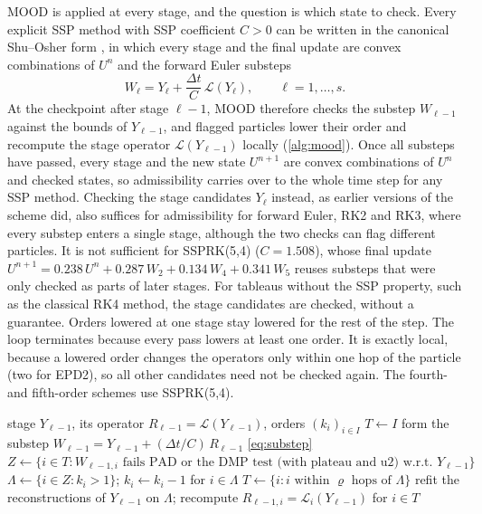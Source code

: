 \documentclass[11pt,a4paper]{article}
\numberwithin{equation}{section}
\newcommand{\Lop}{\mathcal{L}}
\begin{document}
MOOD is applied at every stage, and the question is which state to check. Every explicit SSP method with SSP coefficient $C>0$ can be written in the canonical Shu--Osher form \cite{Ketcheson2008,GottliebKetchesonShu2011}, in which every stage and the final update are convex combinations of $U^n$ and the forward Euler substeps
\begin{equation}\label{eq:substep}
W_\ell = Y_\ell+\frac{\Delta t}{C}\,\Lop(Y_\ell),\qquad \ell=1,\dots,s.
\end{equation}
At the checkpoint after stage $\ell-1$, MOOD therefore checks the substep $W_{\ell-1}$ against the bounds of $Y_{\ell-1}$, and flagged particles lower their order and recompute the stage operator $\Lop(Y_{\ell-1})$ locally (\cref{alg:mood}). Once all substeps have passed, every stage and the new state $U^{n+1}$ are convex combinations of $U^n$ and checked states, so admissibility carries over to the whole time step for any SSP method. Checking the stage candidates $Y_\ell$ instead, as earlier versions of the scheme did, also suffices for admissibility for forward Euler, RK2 and RK3, where every substep enters a single stage, although the two checks can flag different particles. It is not sufficient for SSPRK(5,4) ($C=1.508$), whose final update $U^{n+1}=0.238\,U^n+0.287\,W_2+0.134\,W_4+0.341\,W_5$ reuses substeps that were only checked as parts of later stages. For tableaus without the SSP property, such as the classical RK4 method, the stage candidates are checked, without a guarantee. Orders lowered at one stage stay lowered for the rest of the step. The loop terminates because every pass lowers at least one order. It is exactly local, because a lowered order changes the operators only within one hop of the particle (two for EPD2), so all other candidates need not be checked again. The fourth- and fifth-order schemes use SSPRK(5,4).

\begin{algorithm}[t]
\caption{MOOD checkpoint after stage $\ell-1$, $2\le \ell\le s+1$, for an SSP method with coefficient $C$.}\label{alg:mood}
\begin{algorithmic}[1]
\Require stage $Y_{\ell-1}$, its operator $R_{\ell-1}=\Lop(Y_{\ell-1})$, orders $(k_i)_{i\in I}$
\State $T\gets I$ 
\Loop
  \State form the substep $W_{\ell-1}=Y_{\ell-1}+(\Delta t/C)\,R_{\ell-1}$ \eqref{eq:substep}
  \State $Z\gets\{i\in T: W_{\ell-1,i} \text{ fails PAD or the DMP test (with plateau and u2) w.r.t.\ } Y_{\ell-1}\}$
  \State $\Lambda\gets\{i\in Z: k_i>1\}$; \quad $k_i\gets k_i-1$ for $i\in \Lambda$
  \If{$\Lambda=\emptyset$} \Return \EndIf
  \State $T\gets\{i: \text{$i$ within $\varrho$ hops of $\Lambda$}\}$ 
  \State refit the reconstructions of $Y_{\ell-1}$ on $\Lambda$; recompute $R_{\ell-1,i}=\Lop_i(Y_{\ell-1})$ for $i\in T$
\EndLoop
\end{algorithmic}
\end{algorithm}
\end{document}
